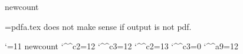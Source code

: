 
\ifx\pdfoutput\undefined \csname newcount\endcsname\pdfoutput \fi

\let\next=\endinput
\ifcase\pdfoutput
 \errhelp={pdfa.tex does not make sense if output is not pdf.}
\else
 \let\next=\relax
\fi
\next


\catcode`\@=11
\ifx\count@@\undefined \csname newcount\endcsname\count@@\fi
\edef\Acircumflexcatcode{\the\catcode`\^^c2}
\edef\Atildecatcode{\the\catcode`\^^c3}
\edef\copyrightcatcode{\the\catcode`\^^a9}
\ifx\Acircumflex\undefined \catcode`\^^c2=12 \def\Acircumflex{^^c2}\fi
\ifx\Atilde\undefined \catcode`\^^c3=12 \def\Atilde{^^c3}\fi
\catcode`\^^c2=13
\catcode`\^^c3=0
\catcode`\^^a9=12 %

\def\@gobble#1{}
\def\hash{\expandafter\@gobble\string\#}
\def\amp{\expandafter\@gobble\string\&}
\def\htmlAmp{\amp\hash x0026;}
\def\htmlCopyright{\amp\hash x00A9;}

\def\dountil#1\continue{\def\body{#1}\reiterate}
\def\reiterate{\body \let\next\relax \else \let\next\reiterate \fi \next}
\let\continue=\fi

\def\allhighother{\count@=128 %
 \loop \catcode\count@=12 \ifnum\count@<255 \advance\count@ by 1\repeat}

\def\@utf{\allhighother \catcode`\^^c2=13 \catcode`\^^c3=0 }

\ifx\xmpTitle\undefined \let\xmpTitle\jobname \fi
\ifx\xmpAuthor\undefined {}\fi %
\ifx\xmpOrg\undefined \let\xmpOrg\empty \fi
\ifx\xmpOwner\undefined \let\xmpOwner\xmpAuthor \fi %
\ifx\xmpCopyright\undefined \def\xmpCopyright{^^c2^^a9 \xmpOwner\space\the\year}\fi
\ifx\xmpWebStatement\undefined \let\xmpWebStatement\empty \fi
\ifx\xmpCertificate\undefined \let\xmpCertificate\empty \fi
\ifx\xmpUsageTerms\undefined \let\xmpUsageTerms=\xmpCopyright \fi
\ifx\xmpDoi\undefined \let\xmpDoi\empty \fi
\ifx\xmpSubject\undefined \let\xmpSubject\empty \fi
\ifx\xmpKeywords\undefined \let\xmpKeywords\empty \fi %
\ifx\xmpJournaltitle\undefined \let\xmpJournaltitle\empty \fi
\ifx\xmpJournalnumber\undefined \let\xmpJournalnumber\empty \fi
\ifx\xmpVolume\undefined \let\xmpVolume\empty \fi
\ifx\xmpIssue\undefined \let\xmpIssue\empty \fi
\ifx\xmpCoverDate\undefined \let\xmpCoverDate\empty \fi
\ifx\xmpCoverDisplayDate\undefined \let\xmpCoverDisplayDate\empty \fi
\ifx\xmpFirstpage\undefined \let\xmpFirstpage\empty \fi
\ifx\xmpLastpage\undefined \let\xmpLastpage\empty \fi
\ifx\xmpCreator\undefined \def\xmpCreator{TeX}\fi
\ifx\xmpProducer\undefined \def\xmpProducer{pdfTeX}\fi

